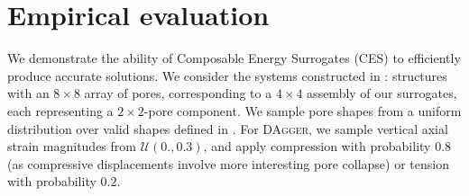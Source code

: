 \section{Empirical evaluation}
\label{sec:results}
We demonstrate the ability of Composable Energy Surrogates (CES) to efficiently produce accurate solutions. We consider the systems constructed in \citet{overvelde2014relating}: structures with an $8\times8$ array of pores, corresponding to a $4\times4$ assembly of our surrogates, each representing a $2\times2$-pore component. We sample pore shapes from a uniform distribution over valid shapes defined in \citet{overvelde2014relating}. For \textsc{DAgger}, we sample vertical axial strain magnitudes from $\mathcal{U}(0., 0.3)$, and apply compression with probability $0.8$ (as compressive displacements involve more interesting pore collapse) or tension with probability $0.2$.

